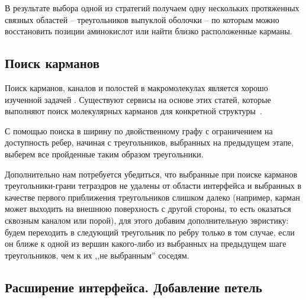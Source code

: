 В результате выбора одной из стратегий получаем одну нескольких протяженных связных областей -- треугольников выпуклой оболочки -- по которым можно восстановить позиции аминокислот или найти близко расположенные карманы.

\subsection{Поиск карманов}
Поиск карманов, каналов и полостей в макромолекулах является хорошо изученной задачей \cite{alpha_shapes1995, alpha_shapes1998, caver2007, ppi_kim2006}. Существуют сервисы на основе этих статей, которые выполняют поиск молекулярных карманов для конкретной структуры~\cite{castp}. 

С помощью поиска в ширину по двойственному графу с ограничением на доступность ребер, начиная с треугольников, выбранных на предыдущем этапе, выберем все пройденные таким образом треугольники.

Дополнительно нам потребуется убедиться, что выбранные при поиске карманов треугольники-грани тетраэдров не удалены от области интерфейса и выбранных в качестве первого приближения треугольников слишком далеко (например, карман может выходить на внешнюю поверхность с другой стороны, то есть оказаться сквозным каналом или порой), для этого добавим дополнительную эвристику: будем переходить в следующий треугольник по ребру только в том случае, если он ближе к одной из вершин какого-либо из выбранных на предыдущем шаге треугольников, чем к их ,,не выбранным'' соседям.

\subsection{Расширение интерфейса. Добавление петель}

